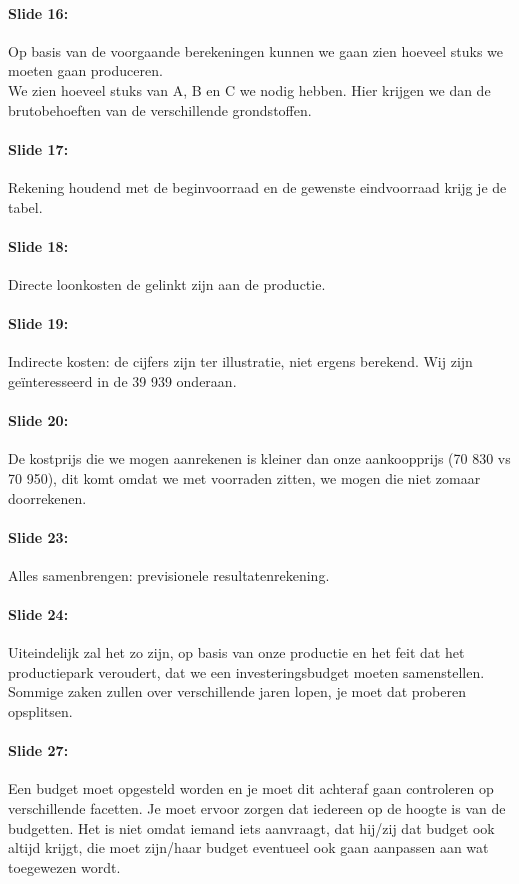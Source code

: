 \documentclass[10pt,a4paper]{report}
\begin{document}
\paragraph{Slide 16:} Op basis van de voorgaande berekeningen kunnen we gaan zien hoeveel stuks we moeten gaan produceren.\\
We zien hoeveel stuks van A, B en C we nodig hebben. Hier krijgen we dan de brutobehoeften van de verschillende grondstoffen. 

\paragraph{Slide 17:} Rekening houdend met de beginvoorraad en de gewenste eindvoorraad krijg je de tabel. 

\paragraph{Slide 18:} Directe loonkosten de gelinkt zijn aan de productie. 

\paragraph{Slide 19:} Indirecte kosten: de cijfers zijn ter illustratie, niet ergens berekend. Wij zijn ge\"interesseerd in de 39 939 onderaan.

\paragraph{Slide 20:} De kostprijs die we mogen aanrekenen is kleiner dan onze aankoopprijs (70 830 vs 70 950), dit komt omdat we met voorraden zitten, we mogen die niet zomaar doorrekenen.

\paragraph{Slide 23:} Alles samenbrengen: previsionele resultatenrekening. 

\paragraph{Slide 24:} Uiteindelijk zal het zo zijn, op basis van onze productie en het feit dat het productiepark veroudert, dat we een investeringsbudget moeten samenstellen. Sommige zaken zullen over verschillende jaren lopen, je moet dat proberen opsplitsen. 

\paragraph{Slide 27:} Een budget moet opgesteld worden en je moet dit achteraf gaan controleren op verschillende facetten. Je moet ervoor zorgen dat iedereen op de hoogte is van de budgetten. Het is niet omdat iemand iets aanvraagt, dat hij/zij dat budget ook altijd krijgt, die moet zijn/haar budget eventueel ook gaan aanpassen aan wat toegewezen wordt. 
\end{document}
